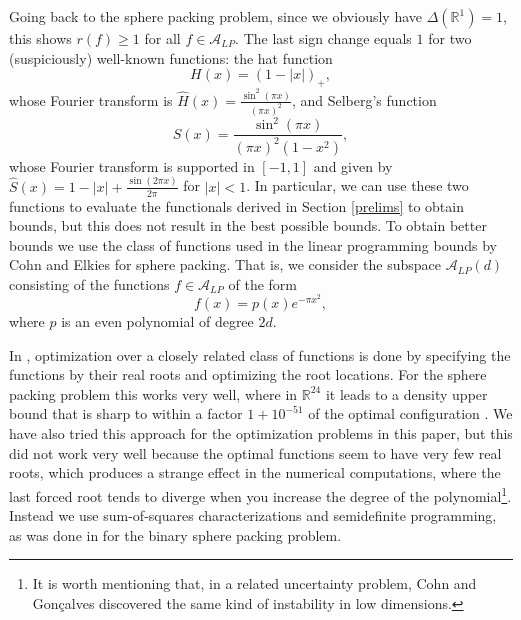 \documentclass[reqno]{amsart}
\newcommand{\A}{\mathcal{A}}
\renewcommand{\r}{\mathbb{R}}
\newcommand{\ft}{\widehat}
\begin{document}
Going back to the sphere packing problem, since we obviously have $\Delta(\r^1)=1$, this shows $r(f)\geq 1$ for all $f\in \A_{LP}$. The last sign change equals $1$ for two (suspiciously) well-known functions: the hat function
\begin{equation*}
H(x)=(1-|x|)_+,
\end{equation*}
whose Fourier transform is $\ft H(x)=\frac{\sin^2(\pi x)}{(\pi x)^2}$, and Selberg's function
\begin{equation*}
S(x)=\frac{\sin^2(\pi x)}{(\pi x)^2(1-x^2)},
\end{equation*}
whose Fourier transform is supported in $[-1,1]$ and given by $\ft S(x)=1-|x|+\frac{\sin(2\pi x)}{2\pi}$ for $|x|<1$. In particular, we can use these two functions to evaluate the functionals derived in Section \ref{prelims} to obtain bounds, but this does not result in the best possible bounds. To obtain better bounds we use the class of functions used in the linear programming bounds by Cohn and Elkies \cite{CE} for sphere packing. That is, we consider the subspace $\A_{LP}(d)$ consisting of the functions 
$f \in \A_{LP}$ of the form 
\begin{equation}\label{eq:subspace} 
f(x) = p(x) e^{-\pi x^2},
\end{equation}
where $p$ is an even polynomial of degree $2d$. 

In \cite{CE}, optimization over a closely related class of functions is done by specifying the functions by their real roots and optimizing the root locations. For the sphere packing problem this works very well, where in $\r^{24}$ it leads to a density upper bound that is sharp to within a factor $1 + 10^{-51}$ of the optimal configuration \cite{CM}. We have also tried this approach for the optimization problems in this paper, but this did not work very well because the optimal functions seem to have very few real roots, which produces a strange effect in the numerical computations, where the last forced root tends to diverge when you increase the degree of the polynomial\footnote{It is worth mentioning that, in a related uncertainty problem, Cohn and Gon\c{c}alves \cite{CGo} discovered the same kind of instability in low dimensions.}. Instead we use sum-of-squares characterizations and semidefinite programming, as was done in \cite{dLOV} for the binary sphere packing problem.
\end{document}
